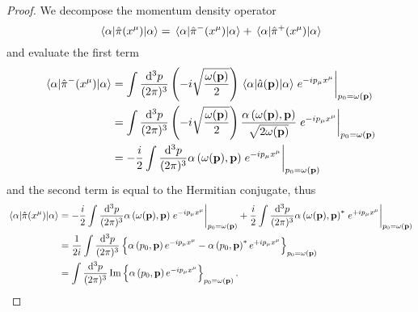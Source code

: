 \begin{proof}
	We decompose the momentum density operator
	\begin{equation*}
		\expval{\hat\pi(x^\mu)}{\alpha}
		=
		\expval{\hat\pi^-(x^\mu)}{\alpha}
		+
		\expval{\hat\pi^+(x^\mu)}{\alpha}
	\end{equation*}
	and evaluate the first term
	\begin{equation*}
		\begin{split}
			\expval{\hat\pi^-(x^\mu)}{\alpha}
			&=
			\int\frac{\dd[3]{p}}{(2\pi)^3}
			\left(
				-i
				\sqrt{\frac{\omega(\vb{p})}{2}}
			\right)
			\expval{\hat{a}(\vb{p})}{\alpha}
			\eval{e^{-ip_\mu x^\mu}}_{p_0=\omega(\vb{p})}
			\\
			&=
			\int\frac{\dd[3]{p}}{(2\pi)^3}
			\left(
				-i
				\sqrt{\frac{\omega(\vb{p})}{2}}
			\right)
			\frac{\alpha\left(\omega(\vb{p}),\vb{p}\right)}{\sqrt{2\omega(\vb{p})}}
			\eval{e^{-ip_\mu x^\mu}}_{p_0=\omega(\vb{p})}
			\\
			&=
			-
			\frac{i}{2}
			\int\frac{\dd[3]{p}}{(2\pi)^3}
			\alpha\left(\omega(\vb{p}),\vb{p}\right)
			\eval{e^{-ip_\mu x^\mu}}_{p_0=\omega(\vb{p})}
		\end{split}
	\end{equation*}
	and the second term is equal to the Hermitian conjugate, thus
	\begin{equation*}
		\begin{split}
			\expval{\hat\pi(x^\mu)}{\alpha}
			&=
			-
			\frac{i}{2}
			\int\frac{\dd[3]{p}}{(2\pi)^3}
			\alpha\left(\omega(\vb{p}),\vb{p}\right)
			\eval{e^{-ip_\mu x^\mu}}_{p_0=\omega(\vb{p})}
			+
			\frac{i}{2}
			\int\frac{\dd[3]{p}}{(2\pi)^3}
			\alpha\left(\omega(\vb{p}),\vb{p}\right)^*
			\eval{e^{+ip_\mu x^\mu}}_{p_0=\omega(\vb{p})}
			\\
			&=
			\frac{1}{2i}
			\int\frac{\dd[3]{p}}{(2\pi)^3}
			\left\{
				\alpha\left(p_0,\vb{p}\right)
				e^{-ip_\mu x^\mu}
				-
				\alpha\left(p_0,\vb{p}\right)^*
				e^{+ip_\mu x^\mu}
			\right\}_{p_0=\omega(\vb{p})}
			\\
			&=
			\int\frac{\dd[3]{p}}{(2\pi)^3}
			\Im\left\{
				\alpha\left(p_0,\vb{p}\right)
				e^{-ip_\mu x^\mu}			
			\right\}_{p_0=\omega(\vb{p})}
			.
		\end{split}
	\end{equation*}
\end{proof}

